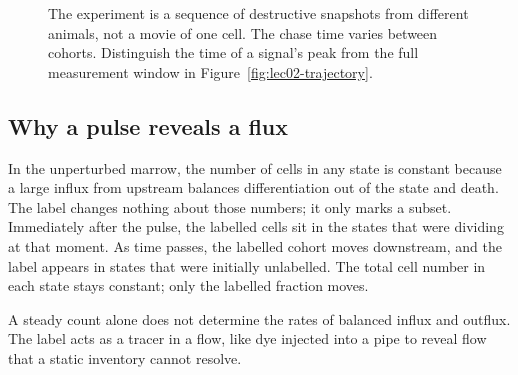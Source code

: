 \begin{figure}[H]
\centering
{}
\caption{The experiment is a sequence of destructive snapshots from different animals, not a movie of one cell. The chase time varies between cohorts. Distinguish the time of a signal's peak from the full measurement window in Figure~\ref{fig:lec02-trajectory}.}\label{fig:lec02-pipeline}
\end{figure}

\subsection{Why a pulse reveals a flux}\label{subsec:lec02:why-pulse}
In the unperturbed marrow, the number of cells in any state is constant because a large influx from upstream balances differentiation out of the state and death. The label changes nothing about those numbers; it only marks a subset. Immediately after the pulse, the labelled cells sit in the states that were dividing at that moment. As time passes, the labelled cohort moves downstream, and the label appears in states that were initially unlabelled. The total cell number in each state stays constant; only the labelled fraction moves.

A steady count alone does not determine the rates of balanced influx and outflux. The label acts as a tracer in a flow, like dye injected into a pipe to reveal flow that a static inventory cannot resolve.

